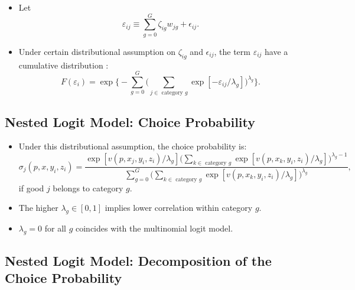 \documentclass[
]{book}
\providecommand{\tightlist}{%
  \setlength{\itemsep}{0pt}\setlength{\parskip}{0pt}}
\begin{document}
\begin{itemize}
\tightlist
\item
  Let
  \begin{equation}
  \varepsilon_{ij} \equiv \sum_{g = 0}^G \zeta_{ig} w_{jg} + \epsilon_{ij}.
  \end{equation}
\item
  Under certain distributional assumption on \(\zeta_{ig}\) and \(\epsilon_{ij}\), the term \(\varepsilon_{ij}\) have a cumulative distribution \citep{Cardell1997}:
  \begin{equation}
  F(\varepsilon_i) = \exp\Bigg\{- \sum_{g = 0}^G \Bigg(\sum_{j \in \text{   category   } g} \exp[-\varepsilon_{ij}/\lambda_g] \Bigg)^{\lambda_g}  \Bigg\}.
  \end{equation}
\end{itemize}

\hypertarget{nested-logit-model-choice-probability}{%
\subsection{Nested Logit Model: Choice Probability}\label{nested-logit-model-choice-probability}}

\begin{itemize}
\tightlist
\item
  Under this distributional assumption, the choice probability is:
  \begin{equation}
  \sigma_{j}(p, x, y_i, z_i) = \frac{\exp[v(p, x_j, y_i, z_i)/\lambda_g] \Bigg(\sum_{k \in \text{   category   } g} \exp[v(p, x_k, y_i, z_i)/\lambda_g]\Bigg)^{\lambda_g - 1}}{\sum_{g = 0}^G \Bigg(\sum_{k \in \text{   category   } g} \exp[v(p, x_k, y_i, z_i)/\lambda_g]\Bigg)^{\lambda_g}},
  \end{equation}
  if good \(j\) belongs to category \(g\).
\item
  The higher \(\lambda_g \in [0, 1]\) implies lower correlation within category \(g\).
\item
  \(\lambda_g = 0\) for all \(g\) coincides with the multinomial logit model.
\end{itemize}

\hypertarget{nested-logit-model-decomposition-of-the-choice-probability}{%
\subsection{Nested Logit Model: Decomposition of the Choice Probability}\label{nested-logit-model-decomposition-of-the-choice-probability}}
\end{document}

